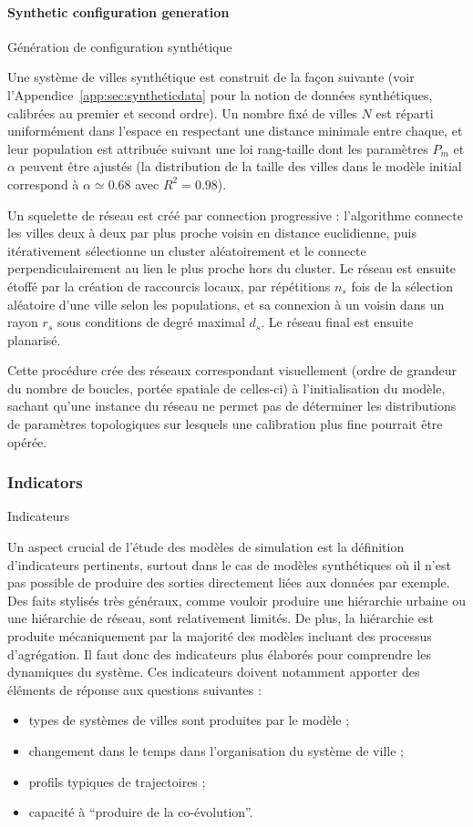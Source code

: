 \paragraph{Synthetic configuration generation}{Génération de configuration synthétique}

Une système de villes synthétique est construit de la façon suivante (voir l'Appendice~\ref{app:sec:syntheticdata} pour la notion de données synthétiques, calibrées au premier et second ordre). Un nombre fixé de villes $N$ est réparti uniformément dans l'espace en respectant une distance minimale entre chaque, et leur population est attribuée suivant une loi rang-taille dont les paramètres $P_{m}$ et $\alpha$ peuvent être ajustés (la distribution de la taille des villes dans le modèle initial correspond à $\alpha\simeq 0.68$ avec $R^2=0.98$).

Un squelette de réseau est créé par connection progressive : l'algorithme connecte les villes deux à deux par plus proche voisin en distance euclidienne, puis itérativement sélectionne un cluster aléatoirement et le connecte perpendiculairement au lien le plus proche hors du cluster. Le réseau est ensuite étoffé par la création de raccourcis locaux, par répétitions $n_s$ fois de la sélection aléatoire d'une ville selon les populations, et sa connexion à un voisin dans un rayon $r_s$ sous conditions de degré maximal $d_s$. Le réseau final est ensuite planarisé.

Cette procédure crée des réseaux correspondant visuellement (ordre de grandeur du nombre de boucles, portée spatiale de celles-ci) à l'initialisation du modèle, sachant qu'une instance du réseau ne permet pas de déterminer les distributions de paramètres topologiques sur lesquels une calibration plus fine pourrait être opérée.



\subsubsection{Indicators}{Indicateurs}

Un aspect crucial de l'étude des modèles de simulation est la définition d'indicateurs pertinents, surtout dans le cas de modèles synthétiques où il n'est pas possible de produire des sorties directement liées aux données par exemple. Des faits stylisés très généraux, comme vouloir produire une hiérarchie urbaine ou une hiérarchie de réseau, sont relativement limités. De plus, la hiérarchie est produite mécaniquement par la majorité des modèles incluant des processus d'agrégation. Il faut donc des indicateurs plus élaborés pour comprendre les dynamiques du système. Ces indicateurs doivent notamment apporter des éléments de réponse aux questions suivantes : 
 \begin{itemize}
 	\item types de systèmes de villes sont produites par le modèle ;
 	\item changement dans le temps dans l'organisation du système de ville ;
 	\item profils typiques de trajectoires ;
 	\item capacité à ``produire de la co-évolution''.
 \end{itemize}


